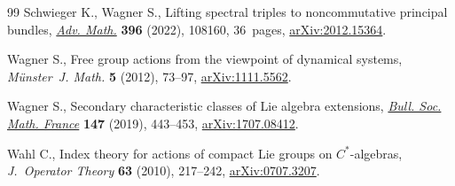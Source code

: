 \begin{thebibliography}{99}
Schwieger K., Wagner S., Lifting spectral triples to noncommutative principal
 bundles, \href{https://doi.org/10.1016/j.aim.2021.108160}{\textit{Adv. Math.}} \textbf{396} (2022), 108160, 36~pages,
 \href{https://arxiv.org/abs/2012.15364}{arXiv:2012.15364}.

Wagner S., Free group actions from the viewpoint of dynamical systems,
 \textit{M\"unster~J. Math.} \textbf{5} (2012), 73--97, \href{https://arxiv.org/abs/1111.5562}{arXiv:1111.5562}.

Wagner S., Secondary characteristic classes of {L}ie algebra extensions,
 \href{https://doi.org/10.24033/bsmf.278}{\textit{Bull. Soc. Math. France}} \textbf{147} (2019), 443--453,
 \href{https://arxiv.org/abs/1707.08412}{arXiv:1707.08412}.

Wahl C., Index theory for actions of compact {L}ie groups on {$C^*$}-algebras,
 \textit{J.~Operator Theory} \textbf{63} (2010), 217--242, \href{https://arxiv.org/abs/0707.3207}{arXiv:0707.3207}.

\end{thebibliography}
